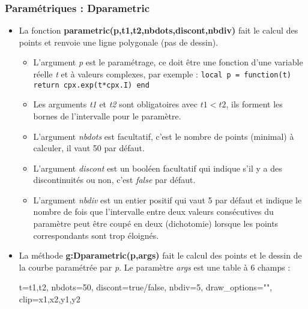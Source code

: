 \subsubsection{Paramétriques : Dparametric}

\begin{itemize}
\item La fonction \textbf{parametric(p,t1,t2,nbdots,discont,nbdiv)} fait le calcul des points et renvoie une ligne polygonale (pas de dessin).
  \begin{itemize}
    \item L'argument \emph{p} est le paramétrage, ce doit être une fonction d'une variable réelle \emph{t} et à valeurs complexes, par exemple :
    \texttt{local p = function(t) return cpx.exp(t*cpx.I) end}
    \item  Les arguments \emph{t1} et \emph{t2} sont obligatoires avec \(t1 < t2\), ils forment les bornes de l'intervalle pour le paramètre.
    \item L'argument \emph{nbdots} est facultatif, c'est le nombre de points (minimal) à calculer, il vaut 50 par défaut.
    \item L'argument \emph{discont} est un booléen facultatif qui indique s'il y a des discontinuités ou non, c'est \emph{false} par défaut.
    \item L'argument \emph{nbdiv} est un entier positif qui vaut 5 par défaut et indique le nombre de fois que l'intervalle entre deux valeurs consécutives du paramètre peut être coupé en deux (dichotomie) lorsque les points correspondants sont trop éloignés.
  \end{itemize}
  
\item La méthode \textbf{g:Dparametric(p,args)} fait le calcul des points et le dessin de la courbe paramétrée par \emph{p}. Le paramètre \emph{args} est une table à 6 champs :

\begin{TeXcode}
 { t={t1,t2}, nbdots=50, discont=true/false, nbdiv=5, draw_options="", clip={x1,x2,y1,y2} }
\end{TeXcode}


\end{itemize}
